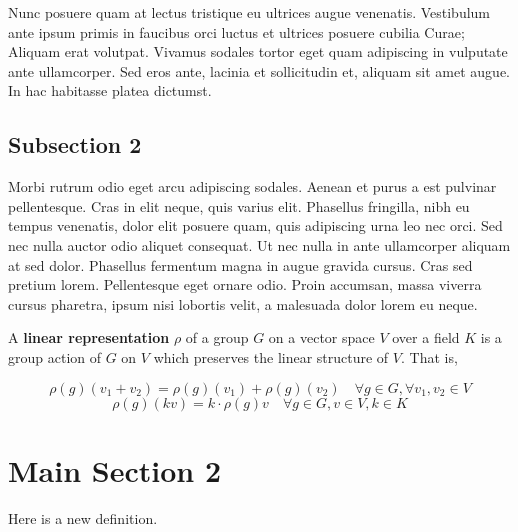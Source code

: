 Nunc posuere quam at lectus tristique eu ultrices augue venenatis. Vestibulum ante ipsum primis in faucibus orci luctus et ultrices posuere cubilia Curae; Aliquam erat volutpat. Vivamus sodales tortor eget quam adipiscing in vulputate ante ullamcorper. Sed eros ante, lacinia et sollicitudin et, aliquam sit amet augue. In hac habitasse platea dictumst.


\subsection{Subsection 2}
Morbi rutrum odio eget arcu adipiscing sodales. Aenean et purus a est pulvinar pellentesque. Cras in elit neque, quis varius elit. Phasellus fringilla, nibh eu tempus venenatis, dolor elit posuere quam, quis adipiscing urna leo nec orci. Sed nec nulla auctor odio aliquet consequat. Ut nec nulla in ante ullamcorper aliquam at sed dolor. Phasellus fermentum magna in augue gravida cursus. Cras sed pretium lorem. Pellentesque eget ornare odio. Proin accumsan, massa viverra cursus pharetra, ipsum nisi lobortis velit, a malesuada dolor lorem eu neque.


\begin{defn}A \textbf{linear representation} $\rho$ of a group $G$ on a vector space $V$ over a field $K$ is a group action of $G$ on $V$ which preserves the linear structure of $V$.  That is, 


\begin{equation} \rho(g)(v_1+v_2)=\rho(g)(v_1)+\rho(g)(v_2) \quad  \forall g \in G, \forall v_1, v_2 \in V \end{equation}
 \[\rho(g)(kv) = k \cdot \rho(g)v \quad \forall g \in G, v \in V, k \in K \]

 \end{defn}

\section{Main Section 2}


\begin{defn}Here is a new definition.\end{defn}

